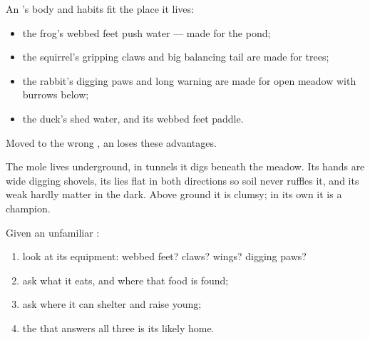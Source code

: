 \begin{proposition}\label{prop:g2:where-animals-live:fit}
An 's body and habits fit the place it lives:
\begin{itemize}
  \item the frog's webbed feet push water --- made for the pond;
  \item the squirrel's gripping claws and big balancing tail are
        made for trees;
  \item the rabbit's digging paws and long warning  are made
        for open meadow with burrows below;
  \item the duck's  shed water, and its webbed feet
        paddle.
\end{itemize}
Moved to the wrong , an  loses these advantages.
\end{proposition}
\admitted

\begin{example}\label{ex:g2:where-animals-live:mole}
The mole lives underground, in tunnels it digs beneath the
meadow. Its hands are wide digging shovels, its  lies flat in
both directions so soil never ruffles it, and its weak 
hardly matter in the dark. Above ground it is clumsy; in its own
 it is a champion.
\end{example}

\begin{method}\label{met:g2:where-animals-live:matching}
Given an unfamiliar :
\begin{enumerate}
  \item look at its equipment: webbed feet? claws? wings? digging
        paws?
  \item ask what it eats, and where that food is found;
  \item ask where it can shelter and raise young;
  \item the  that answers all three is its likely home.
\end{enumerate}
\end{method}

